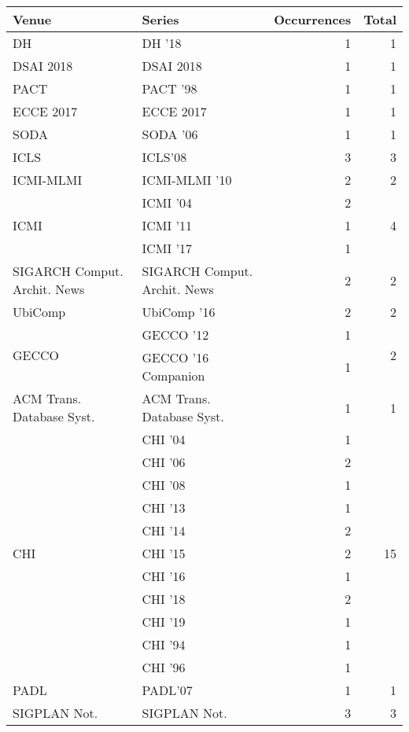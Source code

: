 \begin{table*}[t]
\begin{tabular}{llrr}
Venue & Series & Occurrences & Total\\\hline
\multirow{1}{*}{DH } & DH '18 & 1 & \multirow{1}{*}{1}\\
\multirow{1}{*}{DSAI 2018} & DSAI 2018 & 1 & \multirow{1}{*}{1}\\
\multirow{1}{*}{PACT } & PACT '98 & 1 & \multirow{1}{*}{1}\\
\multirow{1}{*}{ECCE 2017} & ECCE 2017 & 1 & \multirow{1}{*}{1}\\
\multirow{1}{*}{SODA } & SODA '06 & 1 & \multirow{1}{*}{1}\\
\multirow{1}{*}{ICLS} & ICLS'08 & 3 & \multirow{1}{*}{3}\\
\multirow{1}{*}{ICMI-MLMI } & ICMI-MLMI '10 & 2 & \multirow{1}{*}{2}\\
\multirow{3}{*}{ICMI } & ICMI '04 & 2 & \multirow{3}{*}{4}\\
& ICMI '11 & 1 &\\
& ICMI '17 & 1 &\\
\multirow{1}{*}{SIGARCH Comput. Archit. News} & SIGARCH Comput. Archit. News & 2 & \multirow{1}{*}{2}\\
\multirow{1}{*}{UbiComp } & UbiComp '16 & 2 & \multirow{1}{*}{2}\\
\multirow{2}{*}{GECCO } & GECCO '12 & 1 & \multirow{2}{*}{2}\\
& GECCO '16 Companion & 1 &\\
\multirow{1}{*}{ACM Trans. Database Syst.} & ACM Trans. Database Syst. & 1 & \multirow{1}{*}{1}\\
\multirow{11}{*}{CHI } & CHI '04 & 1 & \multirow{11}{*}{15}\\
& CHI '06 & 2 &\\
& CHI '08 & 1 &\\
& CHI '13 & 1 &\\
& CHI '14 & 2 &\\
& CHI '15 & 2 &\\
& CHI '16 & 1 &\\
& CHI '18 & 2 &\\
& CHI '19 & 1 &\\
& CHI '94 & 1 &\\
& CHI '96 & 1 &\\
\multirow{1}{*}{PADL} & PADL'07 & 1 & \multirow{1}{*}{1}\\
\multirow{1}{*}{SIGPLAN Not.} & SIGPLAN Not. & 3 & \multirow{1}{*}{3}\\

\end{tabular}
\end{table*}
